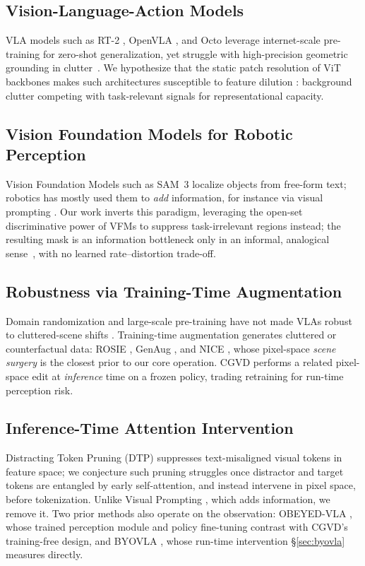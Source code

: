 \documentclass[letterpaper, 10 pt, conference]{ieeeconf}  %
\begin{document}
\subsection{Vision-Language-Action Models}
VLA models such as RT-2 \cite{rt2}, OpenVLA \cite{openvla}, and Octo \cite{octo} leverage internet-scale pre-training for zero-shot generalization, yet struggle with high-precision geometric grounding in clutter~\cite{distracted_robot}. We hypothesize that the static patch resolution of ViT backbones makes such architectures susceptible to feature dilution \cite{distracted_robot}: background clutter competing with task-relevant signals for representational capacity.

\subsection{Vision Foundation Models for Robotic Perception}
Vision Foundation Models such as SAM~3 \cite{sam3} localize objects from free-form text; robotics has mostly used them to \textit{add} information, for instance via visual prompting \cite{RoboticVisualInstruction}. Our work inverts this paradigm, leveraging the open-set discriminative power of VFMs to suppress task-irrelevant regions instead; the resulting mask is an information bottleneck only in an informal, analogical sense~\cite{BC-IB}, with no learned rate--distortion trade-off.

\subsection{Robustness via Training-Time Augmentation}
Domain randomization and large-scale pre-training \cite{bridgedata} have not made VLAs robust to cluttered-scene shifts \cite{robocasa}. Training-time augmentation generates cluttered or counterfactual data: ROSIE \cite{rosie}, GenAug \cite{genaug}, and NICE \cite{nice}, whose pixel-space \emph{scene surgery} is the closest prior to our core operation. CGVD performs a related pixel-space edit at \emph{inference} time on a frozen policy, trading retraining for run-time perception risk.

\subsection{Inference-Time Attention Intervention}
Distracting Token Pruning (DTP) \cite{dtp} suppresses text-misaligned visual tokens in feature space; we conjecture such pruning struggles once distractor and target tokens are entangled by early self-attention, and instead intervene in pixel space, before tokenization. Unlike Visual Prompting \cite{RoboticVisualInstruction}, which adds information, we remove it. Two prior methods also operate on the observation: OBEYED-VLA \cite{obeyed}, whose trained perception module and policy fine-tuning contrast with CGVD's training-free design, and BYOVLA \cite{byovla}, whose run-time intervention \S\ref{sec:byovla} measures directly.
\end{document}
